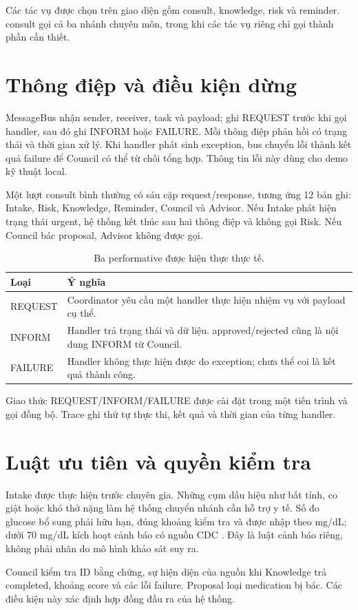 Các tác vụ được chọn trên giao diện gồm consult, knowledge, risk và reminder. consult gọi cả ba nhánh chuyên môn, trong khi các tác vụ riêng chỉ gọi thành phần cần thiết.

\section{Thông điệp và điều kiện dừng}
MessageBus nhận sender, receiver, task và payload; ghi REQUEST trước khi gọi handler, sau đó ghi INFORM hoặc FAILURE. Mỗi thông điệp phản hồi có trạng thái và thời gian xử lý. Khi handler phát sinh exception, bus chuyển lỗi thành kết quả failure để Council có thể từ chối tổng hợp. Thông tin lỗi này dùng cho demo kỹ thuật local.

Một lượt consult bình thường có sáu cặp request/response, tương ứng 12 bản ghi: Intake, Risk, Knowledge, Reminder, Council và Advisor. Nếu Intake phát hiện trạng thái urgent, hệ thống kết thúc sau hai thông điệp và không gọi Risk. Nếu Council bác proposal, Advisor không được gọi.

\begin{table}[H]\centering\small
\caption{Ba performative được hiện thực thực tế.}
\begin{tabularx}{\textwidth}{@{}p{2.5cm}Y@{}}\toprule
Loại & Ý nghĩa \\\midrule
REQUEST & Coordinator yêu cầu một handler thực hiện nhiệm vụ với payload cụ thể. \\
INFORM & Handler trả trạng thái và dữ liệu. approved/rejected cũng là nội dung INFORM từ Council. \\
FAILURE & Handler không thực hiện được do exception; chưa thể coi là kết quả thành công. \\\bottomrule
\end{tabularx}
\end{table}

Giao thức REQUEST/INFORM/FAILURE được cài đặt trong một tiến trình và gọi đồng bộ. Trace ghi thứ tự thực thi, kết quả và thời gian của từng handler.

\section{Luật ưu tiên và quyền kiểm tra}
Intake được thực hiện trước chuyên gia. Những cụm dấu hiệu như bất tỉnh, co giật hoặc khó thở nặng làm hệ thống chuyển nhánh cần hỗ trợ y tế. Số đo glucose bổ sung phải hữu hạn, đúng khoảng kiểm tra và được nhập theo mg/dL; dưới 70 mg/dL kích hoạt cảnh báo có nguồn CDC \cite{cdc_low}. Đây là luật cảnh báo riêng, không phải nhãn do mô hình khảo sát suy ra.

Council kiểm tra ID bằng chứng, sự hiện diện của nguồn khi Knowledge trả completed, khoảng score và các lỗi failure. Proposal loại medication bị bác. Các điều kiện này xác định hợp đồng đầu ra của hệ thống.
